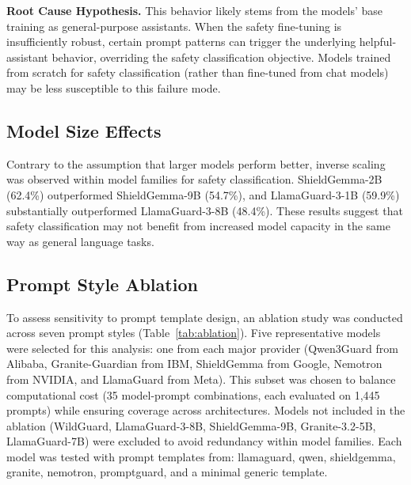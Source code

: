 \documentclass{article}
\begin{document}
\textbf{Root Cause Hypothesis.} This behavior likely stems from the models' base training as general-purpose assistants. When the safety fine-tuning is insufficiently robust, certain prompt patterns can trigger the underlying helpful-assistant behavior, overriding the safety classification objective. Models trained from scratch for safety classification (rather than fine-tuned from chat models) may be less susceptible to this failure mode.

\subsection{Model Size Effects}
Contrary to the assumption that larger models perform better, inverse scaling was observed within model families for safety classification. ShieldGemma-2B (62.4\%) outperformed ShieldGemma-9B (54.7\%), and LlamaGuard-3-1B (59.9\%) substantially outperformed LlamaGuard-3-8B (48.4\%). These results suggest that safety classification may not benefit from increased model capacity in the same way as general language tasks.

\subsection{Prompt Style Ablation}
To assess sensitivity to prompt template design, an ablation study was conducted across seven prompt styles (Table~\ref{tab:ablation}). Five representative models were selected for this analysis: one from each major provider (Qwen3Guard from Alibaba, Granite-Guardian from IBM, ShieldGemma from Google, Nemotron from NVIDIA, and LlamaGuard from Meta). This subset was chosen to balance computational cost (35 model-prompt combinations, each evaluated on 1,445 prompts) while ensuring coverage across architectures. Models not included in the ablation (WildGuard, LlamaGuard-3-8B, ShieldGemma-9B, Granite-3.2-5B, LlamaGuard-7B) were excluded to avoid redundancy within model families. Each model was tested with prompt templates from: llamaguard, qwen, shieldgemma, granite, nemotron, promptguard, and a minimal generic template.
\end{document}
